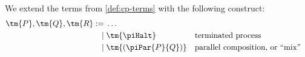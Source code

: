\begin{definition}[Terms]\label{def:hcp-terms}
  We extend the terms from \cref{def:cp-terms} with the following construct:
  \begin{gather*}
    \begin{aligned}
      \tm{P}, \tm{Q}, \tm{R}
          :=& \; \dots
      \\\mid& \; \tm{\piHalt}          &&\text{terminated process}
      \\\mid& \; \tm{( \piPar{P}{Q} )} &&\text{parallel composition, or ``mix''}
    \end{aligned}
  \end{gather*}
\end{definition}
